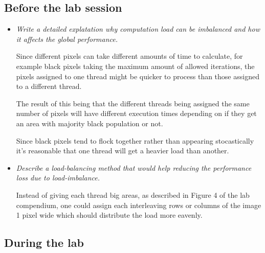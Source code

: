 \documentclass[a4paper,12pt]{article}
\begin{document}
\subsection{Before the lab session}

\begin{itemize}
\item \textit{Write a detailed explatation why computation load can be imbalanced and how it affects the global performance.}

  Since different pixels can take different amounts of time to calculate, for example black pixels taking the maximum amount of allowed iterations, the pixels assigned to one thread might be quicker to process than those assigned to a different thread.

  The result of this being that the different threads being assigned the same number of pixels will have different execution times depending on if they get an area with majority black population or not.

  Since black pixels tend to flock together rather than appearing stocastically it's reasonable that one thread will get a heavier load than another.


\item \textit{Describe a load-balancing method that would help reducing the performance loss due to load-imbalance.}

Instead of giving each thread big areas, as described in Figure 4 of the lab compendium, one could assign each interleaving rows or columns of the image 1 pixel wide which should distribute the load more eavenly.

\end{itemize}



\subsection{During the lab}
\end{document}

